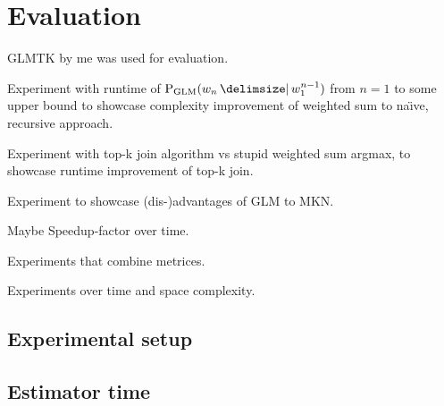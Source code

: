 \chapter{Evaluation}

\begin{draft}
GLMTK by me was used for evaluation.

Experiment with runtime of $\ProbGLM{w_n}{w_1^{n-1}}$ from $n=1$ to some upper
bound to showcase complexity improvement of weighted sum to na{\"\i}ve,
recursive approach.

Experiment with top-k join algorithm vs stupid weighted sum argmax, to showcase
runtime improvement of top-k join.

Experiment to showcase (dis-)advantages of GLM to MKN.

Maybe Speedup-factor over time.

Experiments that combine metrices.

Experiments over time and space complexity.
\end{draft}

\section{Experimental setup}

\section{Estimator time}

\begin{figure}
  \centering
  
  \caption{}
\end{figure}

\begin{figure}
  \centering
  
  \caption{}
\end{figure}

